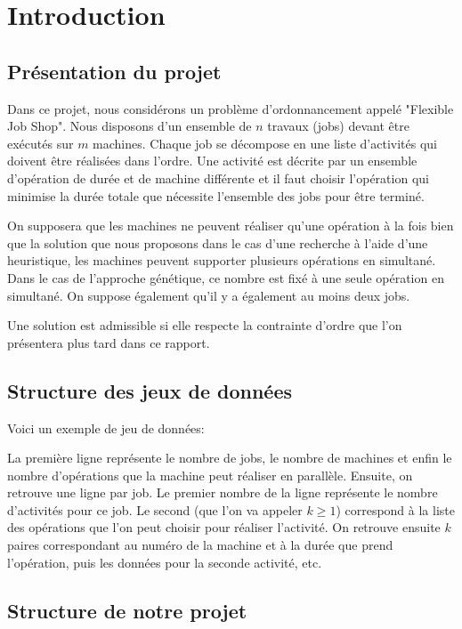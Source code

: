 \section{Introduction}

\subsection{Présentation du projet}

Dans ce projet, nous considérons un problème d'ordonnancement appelé "Flexible Job Shop". Nous disposons d'un ensemble de $n$ travaux (jobs) devant être exécutés sur $m$ machines. Chaque job se décompose en une liste d'activités qui doivent être réalisées dans l'ordre. Une activité est décrite par un ensemble d'opération de durée et de machine différente et il faut choisir l'opération qui minimise la durée totale que nécessite l'ensemble des jobs pour être terminé.

On supposera que les machines ne peuvent réaliser qu'une opération à la fois bien que la solution que nous proposons dans le cas d'une recherche à l'aide d'une heuristique, les machines peuvent supporter plusieurs opérations en simultané. Dans le cas de l'approche génétique, ce nombre est fixé à une seule opération en simultané. On suppose également qu'il y a également au moins deux jobs.

Une solution est admissible si elle respecte la contrainte d'ordre que l'on présentera plus tard dans ce rapport.

\subsection{Structure des jeux de données}

Voici un exemple de jeu de données:


La première ligne représente le nombre de jobs, le nombre de machines et enfin le nombre d'opérations que la machine peut réaliser en parallèle. Ensuite, on retrouve une ligne par job. Le premier nombre de la ligne représente le nombre d'activités pour ce job. Le second (que l'on va appeler $k \geq 1$) correspond à la liste des opérations que l'on peut choisir pour réaliser l'activité. On retrouve ensuite $k$ paires correspondant au numéro de la machine et à la durée que prend l'opération, puis les données pour la seconde activité, etc. 

\subsection{Structure de notre projet}

